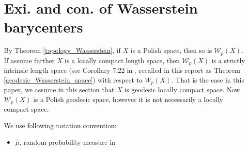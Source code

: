 \section{Exi. and con. of Wasserstein barycenters}
By Theorem \ref{topology_Wasserstein}, if $X$ is a Polish space, then so is $\mathscr{W}_p(X)$. If assume further $X$ is a locally compact length space, then $\mathscr{W}_p(X)$ is a strictly intrinsic length space (see Corollary 7.22 in \cite{villani2008optimal}, recalled in this report as Theorem \ref{geodesic_Wasserstein_space}) with respect to $W_p(X)$. That is the case in this paper, we assume in this section that $X$ is geodesic locally compact space. Now $\mathscr{W}_p(X)$ is a Polish geodesic space, however it is not necessarily a locally compact space.

We use following notation convention:
\begin{itemize}
	\item \( \hat{\mu} \), random probability measure in 
\end{itemize}
